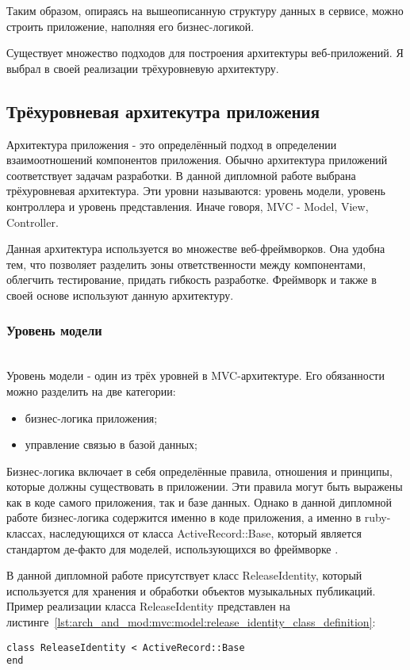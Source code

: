 Таким образом, опираясь на вышеописанную структуру данных в сервисе, можно строить приложение, наполняя его бизнес-логикой.

Существует множество подходов для построения архитектуры веб-приложений. Я выбрал в своей реализации трёхуровневую архитектуру.

\subsection{Трёхуровневая архитекутра приложения}
\label{sub:arch_and_mod:mvc}

Архитектура приложения - это определённый подход в определении взаимоотношений компонентов приложения. Обычно архитектура приложений соответствует задачам разработки. В данной дипломной работе выбрана трёхуровневая архитектура. Эти уровни называются: уровень модели, уровень контроллера и уровень представления. Иначе говоря, MVC - Model, View, Controller.

Данная архитектура используется во множестве веб-фреймворков. Она удобна тем, что позволяет разделить зоны ответственности между компонентами, облегчить тестирование, придать гибкость разработке. Фреймворк \ror{} и \ajs{} также в своей основе используют данную архитектуру.

\subsubsection{Уровень модели}
\label{sub:arch_and_mod:mvc:model}
~\\

Уровень модели - один из трёх уровней в MVC-архитектуре. Его обязанности можно разделить на две категории:

\begin{itemize}
  \item бизнес-логика приложения;
  \item управление связью в базой данных;
\end{itemize}

Бизнес-логика включает в себя определённые правила, отношения и принципы, которые должны существовать в приложении. Эти правила могут быть выражены как в коде самого приложения, так и базе данных. Однако в данной дипломной работе бизнес-логика содержится именно в коде приложения, а именно в ruby-классах, наследующихся от класса ActiveRecord::Base, который является стандартом де-факто для моделей, использующихся во фреймворке \ror{}.

В данной дипломной работе присутствует класс ReleaseIdentity, который используется для хранения и обработки объектов музыкальных публикаций. Пример реализации класса ReleaseIdentity представлен на листинге~\ref{lst:arch_and_mod:mvc:model:release_identity_class_definition}:
\begin{lstlisting}[style=fsharpstyle,caption={Базовая реализация класса ReleaseIdentity}, label=lst:arch_and_mod:mvc:model:release_identity_class_definition]
class ReleaseIdentity < ActiveRecord::Base
end
\end{lstlisting}

